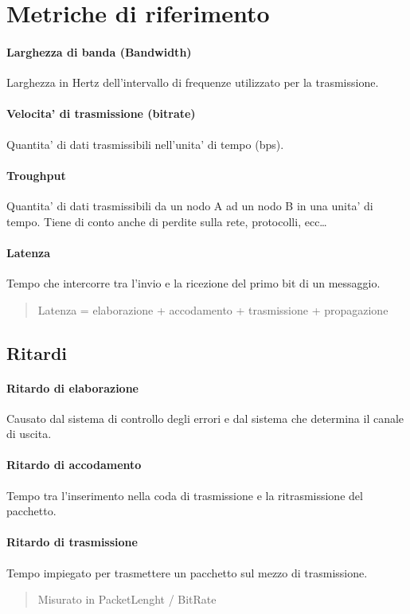 \section{Metriche di riferimento}

\paragraph{Larghezza di banda (Bandwidth)}
Larghezza in Hertz dell'intervallo di frequenze utilizzato per la trasmissione.
\paragraph{Velocita' di trasmissione (bitrate)}
Quantita' di dati trasmissibili nell'unita' di tempo (bps).
\paragraph{Troughput}
Quantita' di dati trasmissibili da un nodo A ad un nodo B in una unita' di tempo.
Tiene di conto anche di perdite sulla rete, protocolli, ecc\dots
\paragraph{Latenza}
Tempo che intercorre tra l'invio e la ricezione del primo bit di un messaggio.
\begin{quote}
    \small Latenza = elaborazione + accodamento + trasmissione + propagazione
\end{quote}
\subsection{Ritardi}
\paragraph{Ritardo di elaborazione}
Causato dal sistema di controllo degli errori e dal sistema che determina il canale di uscita.
\paragraph{Ritardo di accodamento}
Tempo tra l'inserimento nella coda di trasmissione e la ritrasmissione del pacchetto.
\paragraph{Ritardo di trasmissione}
Tempo impiegato per trasmettere un pacchetto sul mezzo di trasmissione.
\begin{quote}
    Misurato in PacketLenght / BitRate
\end{quote}
